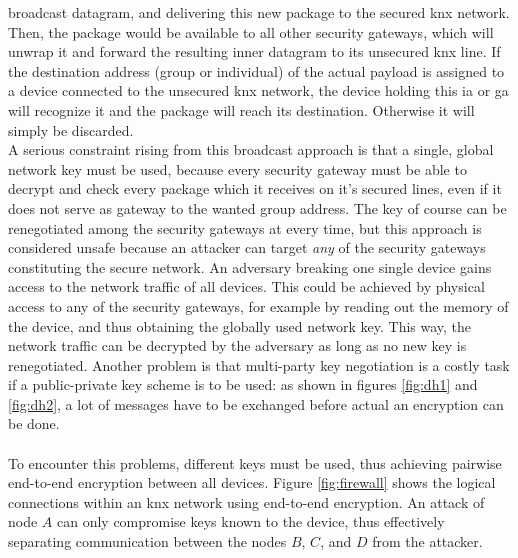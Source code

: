 broadcast datagram, and delivering this new package to the secured \gls{knx} network. Then, the package would be available to all other security gateways, which
will unwrap it and forward the resulting inner datagram to its unsecured \gls{knx} line. If the destination address (group or individual) of the actual payload
is assigned to a device connected
to the unsecured \gls{knx} network, the device holding this \gls{ia} or \gls{ga} will recognize it and the package will reach its destination. 
Otherwise it will simply be discarded.
\\
A serious constraint rising from this broadcast approach is that a single,
global network key must be used, because every security gateway must be able to decrypt and check every package which it receives on it's secured lines,
even if it does not serve as gateway to the wanted group address. 
The key of course can be renegotiated among the security gateways at every time, but this approach is considered
unsafe because an attacker can target \textit{any} of the security gateways constituting the secure network. An adversary breaking one single device gains
access to the network traffic of all devices. This could be achieved by physical access to any of the security gateways, for example by reading out the
memory of the device, and thus obtaining the globally used network key. This way, the network traffic can be decrypted by the adversary as long as no new
key is renegotiated. Another problem is that multi-party key negotiation is a costly task if a public-private key scheme
is to be used: as shown in figures \ref{fig:dh1} and \ref{fig:dh2}, a lot of messages have to be exchanged before actual an encryption can be done. 
\\
\\
To encounter this problems, different keys must be used, thus achieving pairwise end-to-end encryption between all devices. 
Figure \ref{fig:firewall} shows the logical connections within an \gls{knx} network using end-to-end encryption. An 
attack of node $A$ can only compromise keys known to the device, thus effectively separating communication between the nodes $B$, $C$, and $D$ from
the attacker.

